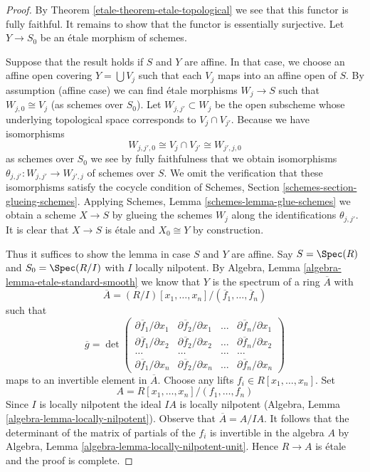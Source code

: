 \begin{proof}

By Theorem \ref{etale-theorem-etale-topological}
we see that this functor is fully faithful.
It remains to show that the functor is essentially surjective.
Let $Y \to S_0$ be an \'etale morphism of schemes.

\medskip\noindent
Suppose that the result holds if $S$ and $Y$ are affine.
In that case, we choose an affine open covering
$Y = \bigcup V_j$ such that each $V_j$ maps
into an affine open of $S$. By assumption (affine case) we can
find \'etale morphisms $W_j \to S$ such that $W_{j, 0} \cong V_j$
(as schemes over $S_0$). Let $W_{j, j'} \subset W_j$
be the open subscheme whose underlying topological space
corresponds to $V_j \cap V_{j'}$. Because we have isomorphisms
$$
W_{j, j', 0} \cong V_j \cap V_{j'} \cong W_{j', j, 0}
$$
as schemes over $S_0$ we see by fully faithfulness that we
obtain isomorphisms
$\theta_{j, j'} : W_{j, j'} \to W_{j', j}$ of schemes over $S$.
We omit the verification that these isomorphisms satisfy the
cocycle condition of Schemes, Section \ref{schemes-section-glueing-schemes}.
Applying Schemes, Lemma \ref{schemes-lemma-glue-schemes}
we obtain a scheme $X \to S$ by
glueing the schemes $W_j$ along the identifications $\theta_{j, j'}$.
It is clear that $X \to S$ is \'etale and $X_0 \cong Y$ by construction.

\medskip\noindent
Thus it suffices to show the lemma in case $S$ and $Y$ are affine.
Say $S = \Spec(R)$ and $S_0 = \Spec(R/I)$ with $I$ locally nilpotent.
By Algebra, Lemma \ref{algebra-lemma-etale-standard-smooth} we know that
$Y$ is the spectrum of a ring $\overline{A}$ with
$$
\overline{A} = (R/I)[x_1, \ldots, x_n]/(\overline{f}_1, \ldots, \overline{f}_n)
$$
such that
$$
\overline{g} =
\det
\left(
\begin{matrix}
\partial \overline{f}_1/\partial x_1 &
\partial \overline{f}_2/\partial x_1 &
\ldots &
\partial \overline{f}_n/\partial x_1 \\
\partial \overline{f}_1/\partial x_2 &
\partial \overline{f}_2/\partial x_2 &
\ldots &
\partial \overline{f}_n/\partial x_2 \\
\ldots & \ldots & \ldots & \ldots \\
\partial \overline{f}_1/\partial x_n &
\partial \overline{f}_2/\partial x_n &
\ldots &
\partial \overline{f}_n/\partial x_n
\end{matrix}
\right)
$$
maps to an invertible element in $\overline{A}$. Choose any lifts
$f_i \in R[x_1, \ldots, x_n]$. Set
$$
A = R[x_1, \ldots, x_n]/(f_1, \ldots, f_n)
$$
Since $I$ is locally nilpotent the ideal $IA$ is locally nilpotent
(Algebra, Lemma \ref{algebra-lemma-locally-nilpotent}).
Observe that $\overline{A} = A/IA$.
It follows that the determinant of the matrix of partials of the
$f_i$ is invertible in the algebra $A$ by
Algebra, Lemma \ref{algebra-lemma-locally-nilpotent-unit}.
Hence $R \to A$ is \'etale and the proof is complete.
\end{proof}

